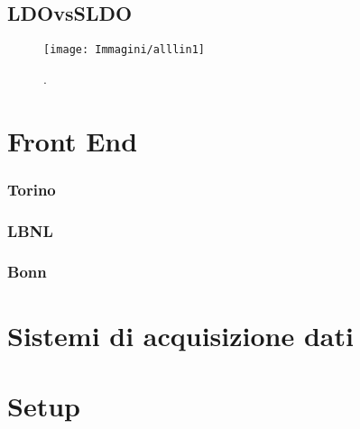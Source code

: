 \subsection{LDOvsSLDO}

\begin{figure}
\centering
\texttt{[image: Immagini/alllin1]}
\caption{.}
\label{alllin1}
\end{figure}


\section{Front End}
\subsubsection{Torino}
\subsubsection{LBNL}
\subsubsection{Bonn}
\section{Sistemi di acquisizione dati}
\section{Setup}

